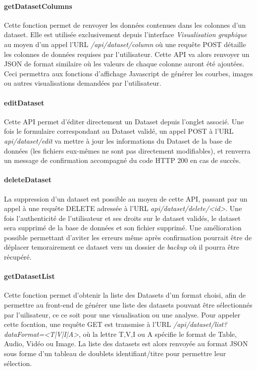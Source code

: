 \documentclass[a4paper]{report}
\begin{document}
\paragraph{getDatasetColumns}
Cette fonction permet de renvoyer les données contenues dans les colonnes d'un dataset. Elle est utilisée exclusivement depuis l'interface \emph{Visualisation graphique} au moyen d'un appel  l'URL \emph{/api/dataset/column} où une requête POST détaille les colonnes de données requises par l'utilisateur. Cette API va alors renvoyer un JSON de format similaire où les valeurs de chaque colonne auront été ajoutées. Ceci permettra aux fonctions d'affichage  Javascript de générer les courbes, images ou autres visualisations demandées par l'utilisateur.

\paragraph{editDataset} Cette API permet d'éditer directement un Dataset depuis l'onglet associé. Une fois le formulaire correspondant au Dataset validé, un appel POST à l'URL \emph{api/dataset/edit} va mettre à jour les informations du Dataset de la base de données (les fichiers eux-mêmes ne sont pas directement modifiables), et renverra un message de confirmation accompagné du code HTTP 200 en cas de succès.

\paragraph{deleteDataset} La suppression d'un dataset est possible au moyen de cette API, passant par un appel à une requête DELETE adressée à l'URL \emph{api/dataset/delete/<id>}. Une fois l'authenticité de l'utilisateur et ses droits sur le dataset validés, le dataset sera supprimé de la base de données et son fichier supprimé. Une amélioration possible permettant d'aviter les erreurs même après confirmation pourrait être de déplacer temorairement ce dataset vers un dossier de \emph{backup} où il pourra être récupéré.

\paragraph{getDatasetList}
Cette fonction permet d'obtenir la liste des Datasets d'un format choisi, afin de permettre au front-end de générer une liste des datasets pouvant être sélectionnés par l'uilisateur, ce ce soit pour une visualisation ou une analyse. Pour appeler cette focntion, une requête GET est transmise à l'URL \emph{/api/dataset/list?dataFormat=<T|V|I|A>}, où la lettre T,V,I ou A spécifie le format de Table, Audio, Vidéo ou Image. La liste des datasets est alors renvoyée au format JSON sous forme d'un tableau de doublets identifiant/titre pour permettre leur sélection.
\end{document}
